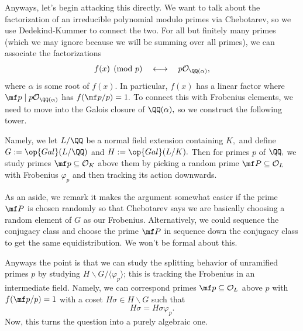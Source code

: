 Anyways, let's begin attacking this directly. We want to talk about the factorization of an irreducible polynomial modulo primes via Chebotarev, so we use Dedekind-Kummer to connect the two. For all but finitely many primes (which we may ignore because we will be summing over all primes), we can associate the factorizations
\[f(x)\pmod p\quad\longleftrightarrow\quad p\mathcal O_{\QQ(\alpha)},\]
where $\alpha$ is some root of $f(x).$ In particular, $f(x)$ has a linear factor where $\mf p\mid p\mathcal O_{\QQ(\alpha)}$ has $f(\mf p/p)=1.$ To connect this with Frobenius elements, we need to move into the Galois closure of $\QQ(\alpha),$ so we construct the following tower.
\begin{center}
\end{center}
Namely, we let $L/\QQ$ be a normal field extension containing $K,$ and define $G:=\op{Gal}(L/\QQ)$ and $H:=\op{Gal}(L/K).$ Then for primes $p$ of $\QQ,$ we study primes $\mf p\subseteq\mathcal O_K$ above them by picking a random prime $\mf P\subseteq\mathcal O_L$ with Frobenius $\varphi_p$ and then tracking its action downwards.

As an aside, we remark it makes the argument somewhat easier if the prime $\mf P$ is chosen randomly so that Chebotarev says we are basically choosing a random element of $G$ as our Frobenius. Alternatively, we could sequence the conjugacy class and choose the prime $\mf P$ in sequence down the conjugacy class to get the same equidistribution. We won't be formal about this.

Anyways the point is that we can study the splitting behavior of unramified primes $p$ by studying $H\backslash G/\langle\varphi_p\rangle$; this is tracking the Frobenius in an intermediate field. Namely, we can correspond primes $\mf p\subseteq\mathcal O_L$ above $p$ with $f(\mf p/p)=1$ with a coset $H\sigma\in H\backslash G$ such that 
\[H\sigma=H\sigma\varphi_p.\]
Now, this turns the question into a purely algebraic one.

